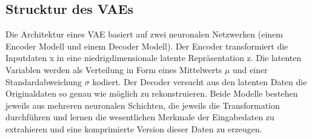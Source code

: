 \documentclass[%
thesis=student,%
coverpage=false,%
titlepage=false,%
headmarks=true, %
german,%
font=libertine, %
math=newpxtx, %
BCOR=5mm,%
coverBCOR=11mm%
]{tumbook}
\theoremstyle{break}
\begin{document}
\subsection{Strucktur des VAEs}
Die Architektur eines VAE basiert auf zwei neuronalen Netzwerken (einem Encoder Modell und einem Decoder Modell). Der Encoder transformiert die Inputdaten x in eine niedrigdimensionale latente Repräsentation z. Die latenten Variablen werden als Verteilung in Form eines Mittelwerts $\mu$ und einer Standardabweichung $\sigma$ kodiert. Der Decoder versucht aus den latenten Daten die Originaldaten so genau wie möglich zu rekonstruieren. Beide Modelle bestehen jeweils aus mehreren neuronalen Schichten, die jeweils die Transformation durchführen und lernen die wesentlichen Merkmale der Eingabedaten zu extrahieren und eine komprimierte Version dieser Daten zu erzeugen.\\
\\
\end{document}
